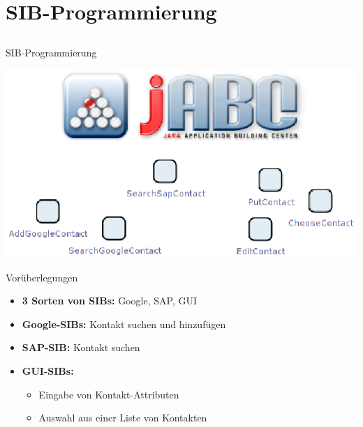 \section{SIB-Programmierung}

\subsection*{}
\begin{frame}{SIB-Programmierung}
	\begin{center}
		\includegraphics[width=\textheight]{Bilder/titel_sibs.png} 
	\end{center}
\end{frame}


\begin{frame}{Vorüberlegungen}
\begin{itemize}[<+->]
	\item \textbf{3 Sorten von SIBs:} Google, SAP, GUI
	\pause
	\item \textbf{Google-SIBs:} Kontakt suchen und hinzufügen
	\item \textbf{SAP-SIB:} Kontakt suchen
	\pause	
	\item \textbf{GUI-SIBs:} 
		\begin{itemize}[<+->]
			\item Eingabe von Kontakt-Attributen
			\item Auswahl aus einer Liste von Kontakten
		\end{itemize}
	
\end{itemize}
\end{frame}



